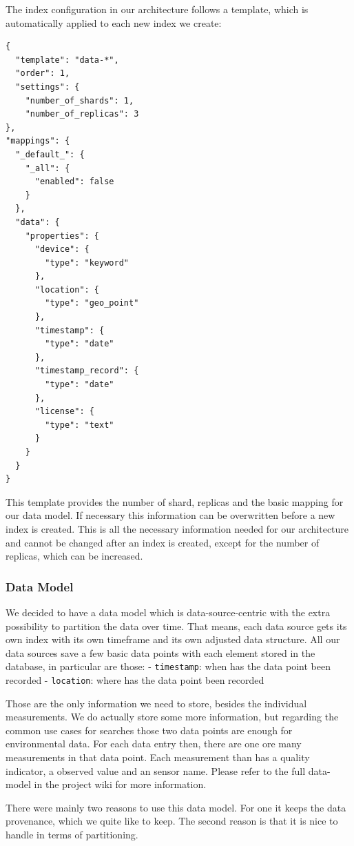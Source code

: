 The index configuration in our architecture follows a template, which is
automatically applied to each new index we create:

\begin{verbatim}
{
  "template": "data-*",
  "order": 1,
  "settings": {
    "number_of_shards": 1,
    "number_of_replicas": 3
},
"mappings": {
  "_default_": {
    "_all": {
      "enabled": false
    }
  },
  "data": {
    "properties": {
      "device": {
        "type": "keyword"
      },
      "location": {
        "type": "geo_point"
      },
      "timestamp": {
        "type": "date"
      },
      "timestamp_record": {
        "type": "date"
      },
      "license": {
        "type": "text"
      }
    }
  }
}
\end{verbatim}

This template provides the number of shard, replicas and the basic
mapping for our data model. If necessary this information can be
overwritten before a new index is created. This is all the necessary
information needed for our architecture and cannot be changed after an
index is created, except for the number of replicas, which can be
increased.

\subsubsection{Data Model}\label{data-model}

We decided to have a data model which is data-source-centric with the
extra possibility to partition the data over time. That means, each data
source gets its own index with its own timeframe and its own adjusted
data structure. All our data sources save a few basic data points with
each element stored in the database, in particular are those: -
\texttt{timestamp}: when has the data point been recorded -
\texttt{location}: where has the data point been recorded

Those are the only information we need to store, besides the individual
measurements. We do actually store some more information, but regarding
the common use cases for searches those two data points are enough for
environmental data. For each data entry then, there are one ore many
measurements in that data point. Each measurement than has a quality
indicator, a observed value and an sensor name. Please refer to the full
data-model in the project wiki for more information.

There were mainly two reasons to use this data model. For one it keeps
the data provenance, which we quite like to keep. The second reason is
that it is nice to handle in terms of partitioning.

